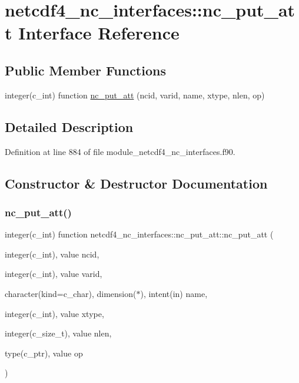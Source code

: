 \hypertarget{interfacenetcdf4__nc__interfaces_1_1nc__put__att}{}\section{netcdf4\+\_\+nc\+\_\+interfaces\+:\+:nc\+\_\+put\+\_\+att Interface Reference}
\label{interfacenetcdf4__nc__interfaces_1_1nc__put__att}
\subsection*{Public Member Functions}
\begin{DoxyCompactItemize}
\item 
integer(c\+\_\+int) function \hyperlink{interfacenetcdf4__nc__interfaces_1_1nc__put__att_ae79ee8536aa520e8eaf4340cb5a139d4}{nc\+\_\+put\+\_\+att} (ncid, varid, name, xtype, nlen, op)
\end{DoxyCompactItemize}


\subsection{Detailed Description}


Definition at line 884 of file module\+\_\+netcdf4\+\_\+nc\+\_\+interfaces.\+f90.



\subsection{Constructor \& Destructor Documentation}
\mbox{\label{interfacenetcdf4__nc__interfaces_1_1nc__put__att_ae79ee8536aa520e8eaf4340cb5a139d4}} 
\subsubsection{\texorpdfstring{nc\+\_\+put\+\_\+att()}{nc\_put\_att()}}
{\footnotesize\ttfamily integer(c\+\_\+int) function netcdf4\+\_\+nc\+\_\+interfaces\+::nc\+\_\+put\+\_\+att\+::nc\+\_\+put\+\_\+att (\begin{DoxyParamCaption}\item[{integer(c\+\_\+int), value}]{ncid,  }\item[{integer(c\+\_\+int), value}]{varid,  }\item[{character(kind=c\+\_\+char), dimension($\ast$), intent(in)}]{name,  }\item[{integer(c\+\_\+int), value}]{xtype,  }\item[{integer(c\+\_\+size\+\_\+t), value}]{nlen,  }\item[{type(c\+\_\+ptr), value}]{op }\end{DoxyParamCaption})}



